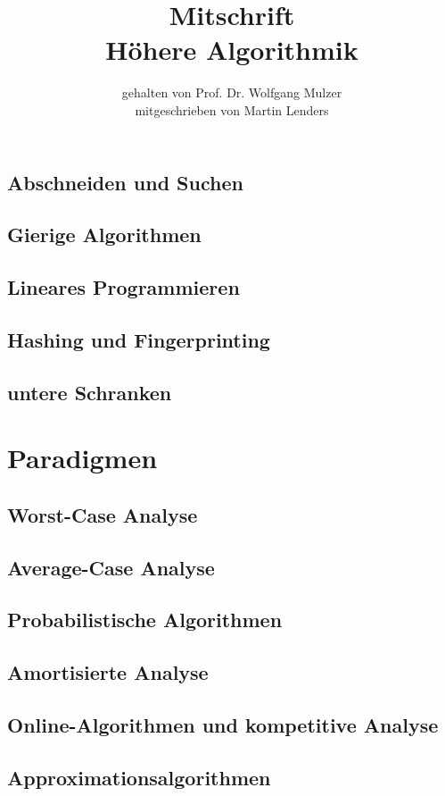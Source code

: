 \documentclass[a4paper,10pt]{scrbook}
\title{Mitschrift\\{\LARGE Höhere Algorithmik}}
\author{gehalten von Prof. Dr. Wolfgang Mulzer \\ mitgeschrieben von Martin Lenders}
\begin{document}
\maketitle
\tableofcontents







\section{Abschneiden und Suchen}
\section{Gierige Algorithmen}
\section{Lineares Programmieren}
\section{Hashing und Fingerprinting}
\section{untere Schranken}
\chapter{Paradigmen}
\section{Worst-Case Analyse}
\section{Average-Case Analyse}
\section{Probabilistische Algorithmen}
\section{Amortisierte Analyse}
\section{Online-Algorithmen und kompetitive Analyse}
\section{Approximationsalgorithmen}
\end{document}
